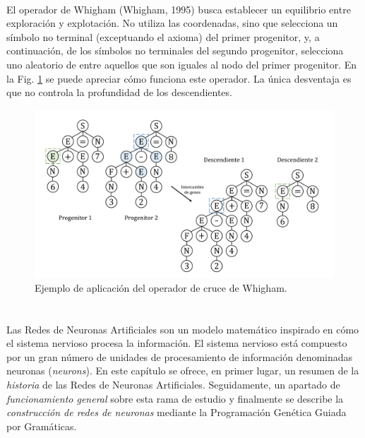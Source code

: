 \documentclass[spanish,a4paper,12pt,twoside]{report}
\begin{document}
        \subsubsection*{\vspace{-0.5cm}{\normalsize Operador de Whigham}}
        \vspace{-0.5cm}
        El operador de Whigham (Whigham, 1995) busca establecer un equilibrio entre exploración y explotación. No utiliza las coordenadas, sino que selecciona un símbolo no terminal (exceptuando el axioma) del primer progenitor, y, a continuación, de los símbolos no terminales del segundo progenitor, selecciona uno aleatorio de entre aquellos que son iguales al nodo del primer progenitor. En la Fig. \ref{fig:9} se puede apreciar cómo funciona este operador. La única desventaja es que no controla la profundidad de los descendientes. \par
        \begin{figure}[H]
          \centering
          \includegraphics[width = 1\textwidth]{resources/Fig9.pdf}
          \caption{Ejemplo de aplicación del operador de cruce de Whigham.}
          \label{fig:9}
        \end{figure} \par
 
  \newpage\cleardoublepage
    
  \chapter*{\vspace{-3cm}{\LARGE 3. Redes de Neuronas Artificiales}}
  \setcounter{figure}{9}
  \vspace{-1cm}
  Las Redes de Neuronas Artificiales son un modelo matemático inspirado en cómo el sistema nervioso procesa la información. El sistema nervioso está compuesto por un gran número de unidades de procesamiento de información denominadas neuronas (\emph{neurons}). En este capítulo se ofrece, en primer lugar, un resumen de la \emph{historia} de las Redes de Neuronas Artificiales. Seguidamente, un apartado de \emph{funcionamiento general} sobre esta rama de estudio y finalmente se describe la \emph{construcción de redes de neuronas} mediante la Programación Genética Guiada por Gramáticas. \par
  
\end{document}
